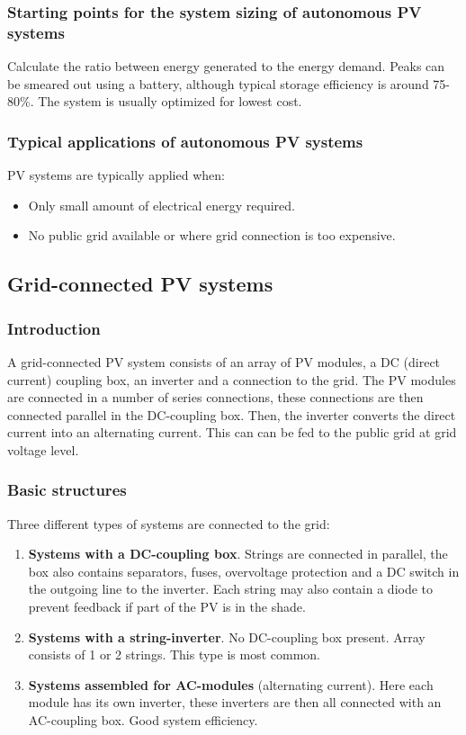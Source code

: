 \documentclass[a4paper,10pt]{article}
\begin{document}
\subsubsection{Starting points for the system sizing of autonomous PV systems}
Calculate the ratio between energy generated to the energy demand. Peaks can be smeared out using a battery, although typical storage efficiency is around 75-80\%. The system is usually optimized for lowest cost.

\subsubsection{Typical applications of autonomous PV systems}
PV systems are typically applied when:
\begin{itemize}
 \item Only small amount of electrical energy required.
 \item No public grid available or where grid connection is too expensive.
\end{itemize}

\subsection{Grid-connected PV systems}
\subsubsection{Introduction}
A grid-connected PV system consists of an array of PV modules, a DC (direct current) coupling box, an inverter and a connection to the grid. The PV modules are connected in a number of series connections, these connections are then connected parallel in the DC-coupling box. Then, the inverter converts the direct current into an alternating current. This can can be fed to the public grid at grid voltage level.

\subsubsection{Basic structures}
Three different types of systems are connected to the grid:
\begin{enumerate}[label=\alph*.]
 \item \textbf{Systems with a DC-coupling box}. Strings are connected in parallel, the box also contains separators, fuses, overvoltage protection and a DC switch in the outgoing line to the inverter. Each string may also contain a diode to prevent feedback if part of the PV is in the shade.
 \item \textbf{Systems with a string-inverter}. No DC-coupling box present. Array consists of 1 or 2 strings. This type is most common.
 \item \textbf{Systems assembled for AC-modules} (alternating current). Here each module has its own inverter, these inverters are then all connected with an AC-coupling box. Good system efficiency.
\end{enumerate}
\end{document}
